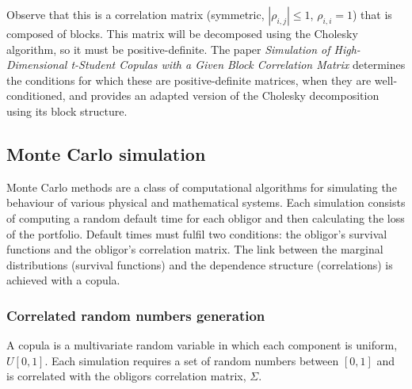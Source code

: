 \documentclass[a4paper,12pt,final]{article}
\begin{document}
Observe that this is a correlation matrix (symmetric, $|\rho_{i,j}| \leq 1$, 
$\rho_{i,i} = 1$) that is composed of blocks. This matrix will be decomposed 
using the Cholesky algorithm, so it must be positive-definite. The paper 
\emph{Simulation of High-Dimensional t-Student Copulas with a Given Block Correlation Matrix} 
\cite{ccruncher:astin} determines the conditions for which these are 
positive-definite matrices, when they are well-conditioned, and provides
an adapted version of the Cholesky decomposition using its block structure.

\subsection{Monte Carlo simulation}
\label{mcsim}
Monte Carlo methods are a class of computational algorithms for 
simulating the behaviour of various physical and mathematical systems. 
Each simulation consists of computing a random default time for each obligor 
and then calculating the loss of the portfolio. Default times must fulfil two 
conditions: the obligor's survival functions and the obligor's correlation 
matrix. The link between the marginal distributions (survival functions) and 
the dependence structure (correlations) is achieved with a copula.

\subsubsection{Correlated random numbers generation}
A copula \cite{copu:pitfalls} \cite{copu:wang} is a multivariate random variable 
in which each component is uniform, $U[0,1]$. Each simulation requires a set of 
random numbers between $[0, 1]$ and is correlated with the obligors correlation 
matrix, $\Sigma$.
\end{document}
